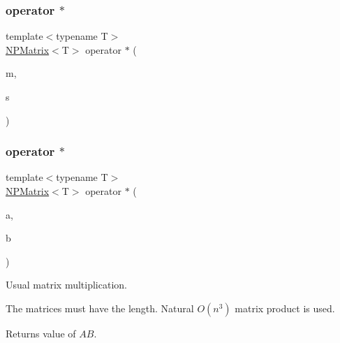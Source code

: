 \mbox{\label{class_n_p_matrix_a89a139dbf286cff061bc6b6c92b57f0b}} 
\subsubsection{\texorpdfstring{operator $\ast$}{operator *}\hspace{0.1cm}{\footnotesize\ttfamily [2/4]}}
{\footnotesize\ttfamily template$<$typename T$>$ \\
\mbox{\hyperlink{class_n_p_matrix}{N\+P\+Matrix}}$<$T$>$ operator $\ast$ (\begin{DoxyParamCaption}\item[{\mbox{\hyperlink{class_n_p_matrix}{N\+P\+Matrix}}$<$ T $>$}]{m,  }\item[{T}]{s }\end{DoxyParamCaption})\hspace{0.3cm}{\ttfamily [friend]}}

\mbox{\label{class_n_p_matrix_ac6fa24ae5fd1897e69914f3ae398d29f}} 
\subsubsection{\texorpdfstring{operator $\ast$}{operator *}\hspace{0.1cm}{\footnotesize\ttfamily [3/4]}}
{\footnotesize\ttfamily template$<$typename T$>$ \\
\mbox{\hyperlink{class_n_p_matrix}{N\+P\+Matrix}}$<$T$>$ operator $\ast$ (\begin{DoxyParamCaption}\item[{\mbox{\hyperlink{class_n_p_matrix}{N\+P\+Matrix}}$<$ T $>$}]{a,  }\item[{const \mbox{\hyperlink{class_n_p_matrix}{N\+P\+Matrix}}$<$ T $>$ \&}]{b }\end{DoxyParamCaption})\hspace{0.3cm}{\ttfamily [friend]}}



Usual matrix multiplication. 

The matrices must have the length. Natural $ O(n^3) $ matrix product is used. \begin{DoxyReturn}{Returns}
value of $ A B $. 
\end{DoxyReturn}
\mbox{\label{class_n_p_matrix_a27b5aa229eb163bfb79d7925abffafb7}} 
